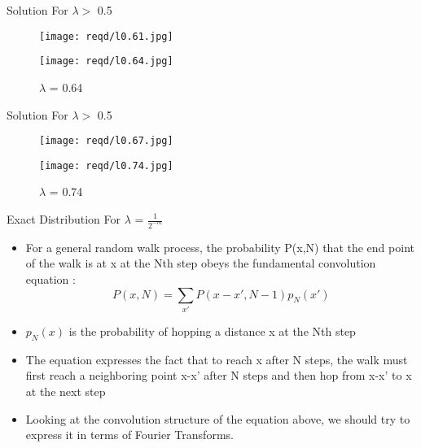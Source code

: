 \documentclass{beamer}
\begin{document}
\begin{frame}{Solution For $\lambda>$ 0.5}
	\begin{figure}
    		\centering
    		\begin{minipage}{0.5\textwidth}
        		\centering
        		\texttt{[image: reqd/l0.61.jpg]}
        		\caption*{$\lambda$ = 0.61}
        	\end{minipage}\hfill
        	\pause
        	\begin{minipage}{0.5\textwidth}
        		\centering
        		\texttt{[image: reqd/l0.64.jpg]}
        		\caption*{$\lambda$ = 0.64}
        	\end{minipage}
	\end{figure}
\end{frame}

\begin{frame}{Solution For $\lambda>$ 0.5}
	\begin{figure}
    		\centering
    		\begin{minipage}{0.5\textwidth}
        		\centering
        		\texttt{[image: reqd/l0.67.jpg]}
        		\caption*{$\lambda$ = 0.67}
        	\end{minipage}\hfill
        	\pause
        	\begin{minipage}{0.5\textwidth}
        		\centering
        		\texttt{[image: reqd/l0.74.jpg]}
        		\caption*{$\lambda$ = 0.74}
        	\end{minipage}
	\end{figure}
\end{frame}

\begin{frame}{Exact Distribution For $\lambda$ = $\frac{1}{2^{-m}}$}
	\begin{itemize}
	\setlength\itemsep{1em}
		\item{\large For a general random walk process, the probability P(x,N) that the end point of the walk is at x at the Nth step obeys the fundamental convolution equation :}
		\begin{equation}
			P(x,N)=\sum_{x'} P(x-x',N-1) p_{N}(x')
		\end{equation}
		\item{\large $p_{N}(x)$ is the probability of hopping a distance x at the Nth step}
		\item{\large The equation expresses the fact that to reach x after N steps, the walk must ﬁrst reach a neighboring point x-x' after N steps and then hop from x-x' to x at the next step}
		\item{\large Looking at the convolution structure of the equation above, we should try to express it in terms of Fourier Transforms.}
	\end{itemize}
\end{frame}
\end{document}

